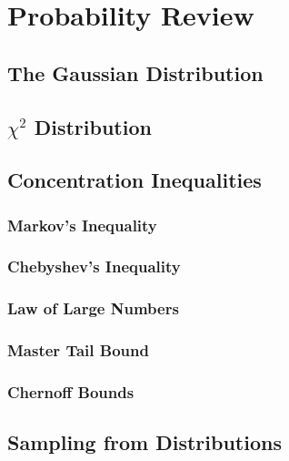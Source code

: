 \section{Probability Review}
\subsection{The Gaussian Distribution}
\label{sec:prob:gaussian}
\subsection{$\chi^2$ Distribution}
\label{sec:prob:chi}
\subsection{Concentration Inequalities}
\label{sec:prob:conc}
\subsubsection{Markov's Inequality}
\label{sec:prob:conc:markov}
\subsubsection{Chebyshev's Inequality}
\label{sec:prob:conc:cheby}
\subsubsection{Law of Large Numbers}
\label{sec:prob:conc:lol}
\subsubsection{Master Tail Bound}
\label{sec:prob:conc:master}
\subsubsection{Chernoff Bounds}
\label{sec:prob:conc:chernoff}
\subsection{Sampling from Distributions}
\label{sec:prob:sampling}
